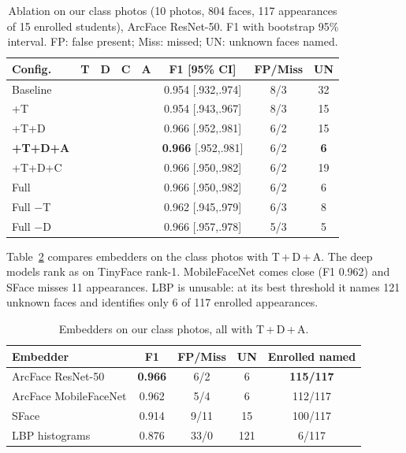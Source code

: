 \documentclass[conference,a4paper]{IEEEtran}
\newcommand{\cmark}{\checkmark}
\begin{document}
\begin{table}[t]
\caption{Ablation on our class photos (10 photos, 804 faces, 117 appearances of 15 enrolled students), ArcFace ResNet-50. F1 with bootstrap 95\% interval. FP: false present; Miss: missed; UN: unknown faces named.}
\label{tab:ablation}
\centering
\setlength{\tabcolsep}{2.6pt}
\begin{tabular}{lccccccc}
\toprule
Config. & T & D & C & A & F1 [95\% CI] & FP/Miss & UN \\
\midrule
Baseline & & & & & 0.954 [.932,.974] & 8/3 & 32 \\
+T & \cmark & & & & 0.954 [.943,.967] & 8/3 & 15 \\
+T+D & \cmark & \cmark & & & 0.966 [.952,.981] & 6/2 & 15 \\
\textbf{+T+D+A} & \cmark & \cmark & & \cmark & \textbf{0.966} [.952,.981] & 6/2 & \textbf{6} \\
+T+D+C & \cmark & \cmark & \cmark & & 0.966 [.950,.982] & 6/2 & 19 \\
Full & \cmark & \cmark & \cmark & \cmark & 0.966 [.950,.982] & 6/2 & 6 \\
Full $-$T & & \cmark & \cmark & \cmark & 0.962 [.945,.979] & 6/3 & 8 \\
Full $-$D & \cmark & & \cmark & \cmark & 0.966 [.957,.978] & 5/3 & 5 \\
\bottomrule
\end{tabular}
\end{table}

Table~\ref{tab:embclass} compares embedders on the class photos with T\,+\,D\,+\,A. The deep models rank as on TinyFace rank-1. MobileFaceNet comes close (F1 0.962) and SFace misses 11 appearances. LBP is unusable: at its best threshold it names 121 unknown faces and identifies only 6 of 117 enrolled appearances.

\begin{table}[t]
\caption{Embedders on our class photos, all with T\,+\,D\,+\,A.}
\label{tab:embclass}
\centering
\setlength{\tabcolsep}{3pt}
\begin{tabular}{lcccc}
\toprule
Embedder & F1 & FP/Miss & UN & Enrolled named \\
\midrule
ArcFace ResNet-50 & \textbf{0.966} & 6/2 & 6 & \textbf{115/117} \\
ArcFace MobileFaceNet & 0.962 & 5/4 & 6 & 112/117 \\
SFace & 0.914 & 9/11 & 15 & 100/117 \\
LBP histograms & 0.876 & 33/0 & 121 & 6/117 \\
\bottomrule
\end{tabular}
\end{table}
\end{document}
